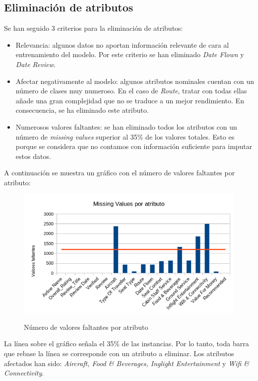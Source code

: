 \documentclass[es]{uc3mreport}
\begin{document}
\begin{report}
\subsection{Eliminación de atributos}
\label{sec:delete_columns}
Se han seguido 3 criterios para la eliminación de atributos:
\begin{itemize}
    \item Relevancia: algunos datos no aportan información relevante de cara al entrenamiento del modelo. Por este criterio se han eliminado \textit{Date Flown} y \textit{Date Review}.
    \item Afectar negativamente al modelo: algunos atributos nominales cuentan con un número de clases muy numeroso. En el caso de \textit{Route}, tratar con todas ellas añade una gran complejidad que no se traduce a un mejor rendimiento. En consecuencia, se ha eliminado este atributo. 
    \item Numerosos valores faltantes: se han eliminado todos los atributos con un número de \textit{missing values} superior al 35\% de los valores totales. Esto es porque se considera que no contamos con información suficiente para imputar estos datos.
\end{itemize}
A continuación se muestra un gráfico con el número de valores faltantes por atributo:

\begin{figure}[H]
    \center
    \includegraphics[width=0.85\linewidth]{missings.png}\\ 
    \caption{Número de valores faltantes por atributo}
\end{figure}

La línea sobre el gráfico señala el 35\% de las instancias. Por lo tanto, toda barra que rebase la línea se corresponde con un atributo a eliminar. Los atributos afectados han sido: \textit{Aircraft, Food \& Beverages, Inglight Entertainment} y \textit{Wifi \& Connectivity}.


\end{report}
\end{document}
